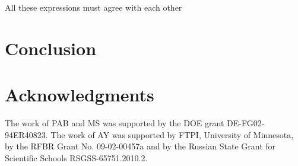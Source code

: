 \documentclass[epsfig,12pt]{article}
\begin{document}
\vspace{0.2cm}
       All these expressions must agree with each other

\newpage

\section{Conclusion}
\label{conclu}
\setcounter{equation}{0}

\section*{Acknowledgments}
The work of PAB and MS was supported by the DOE grant DE-FG02-94ER40823.
The work of AY was  supported
by  FTPI, University of Minnesota,
by the RFBR Grant No. 09-02-00457a
and by the Russian State Grant for
Scientific Schools RSGSS-65751.2010.2.
	
	
\end{document}
